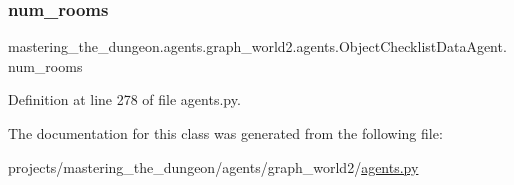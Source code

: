 \subsubsection{\texorpdfstring{num\+\_\+rooms}{num\_rooms}}
{\footnotesize\ttfamily mastering\+\_\+the\+\_\+dungeon.\+agents.\+graph\+\_\+world2.\+agents.\+Object\+Checklist\+Data\+Agent.\+num\+\_\+rooms}



Definition at line 278 of file agents.\+py.



The documentation for this class was generated from the following file\+:\begin{DoxyCompactItemize}
\item 
projects/mastering\+\_\+the\+\_\+dungeon/agents/graph\+\_\+world2/\hyperlink{projects_2mastering__the__dungeon_2agents_2graph__world2_2agents_8py}{agents.\+py}\end{DoxyCompactItemize}
